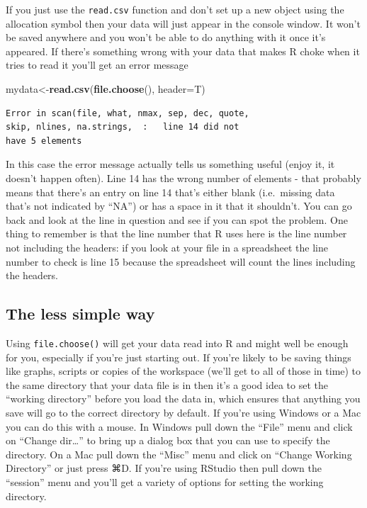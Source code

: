 \documentclass[
]{book}
\newenvironment{Shaded}{\begin{snugshade}}{\end{snugshade}}
\newcommand{\DataTypeTok}[1]{\textcolor[rgb]{0.13,0.29,0.53}{#1}}
\newcommand{\KeywordTok}[1]{\textcolor[rgb]{0.13,0.29,0.53}{\textbf{#1}}}
\newcommand{\NormalTok}[1]{#1}
\begin{document}
If you just use the \texttt{read.csv} function and don't set up a new object using the allocation symbol then your data will just appear in the console window. It won't be saved anywhere and you won't be able to do anything with it once it's appeared. If there's something wrong with your data that makes R choke when it tries to read it you'll get an error message

\begin{Shaded}
\begin{Highlighting}[]
\NormalTok{mydata<-}\KeywordTok{read.csv}\NormalTok{(}\KeywordTok{file.choose}\NormalTok{(), }\DataTypeTok{header=}\NormalTok{T)}
\end{Highlighting}
\end{Shaded}

\begin{verbatim}
Error in scan(file, what, nmax, sep, dec, quote,
skip, nlines, na.strings,  :   line 14 did not
have 5 elements
\end{verbatim}

In this case the error message actually tells us something useful (enjoy it, it doesn't happen often). Line 14 has the wrong number of elements - that probably means that there's an entry on line 14 that's either blank (i.e.~missing data that's not indicated by ``NA'') or has a space in it that it shouldn't. You can go back and look at the line in question and see if you can spot the problem. One thing to remember is that the line number that R uses here is the line number not including the headers: if you look at your file in a spreadsheet the line number to check is line 15 because the spreadsheet will count the lines including the headers.

\hypertarget{the-less-simple-way}{%
\subsection{The less simple way}\label{the-less-simple-way}}

Using \texttt{file.choose()} will get your data read into R and might well be enough for you, especially if you're just starting out. If you're likely to be saving things like graphs, scripts or copies of the workspace (we'll get to all of those in time) to the same directory that your data file is in then it's a good idea to set the ``working directory'' before you load the data in, which ensures that anything you save will go to the correct directory by default. If you're using Windows or a Mac you can do this with a mouse. In Windows pull down the ``File'' menu and click on ``Change dir\ldots{}'' to bring up a dialog box that you can use to specify the directory. On a Mac pull down the ``Misc'' menu and click on ``Change Working Directory'' or just press ⌘D. If you're using RStudio then pull down the ``session'' menu and you'll get a variety of options for setting the working directory.
\end{document}
